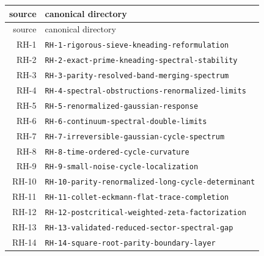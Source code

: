 \begin{longtable}{r >{\raggedright\arraybackslash}p{}}
\toprule
source & canonical directory\\
\midrule
\endfirsthead
\toprule
source & canonical directory\\
\midrule
\endhead
RH-1 & \texttt{RH-\allowbreak{}1-\allowbreak{}rigorous-\allowbreak{}sieve-\allowbreak{}kneading-\allowbreak{}reformulation}\\
RH-2 & \texttt{RH-\allowbreak{}2-\allowbreak{}exact-\allowbreak{}prime-\allowbreak{}kneading-\allowbreak{}spectral-\allowbreak{}stability}\\
RH-3 & \texttt{RH-\allowbreak{}3-\allowbreak{}parity-\allowbreak{}resolved-\allowbreak{}band-\allowbreak{}merging-\allowbreak{}spectrum}\\
RH-4 & \texttt{RH-\allowbreak{}4-\allowbreak{}spectral-\allowbreak{}obstructions-\allowbreak{}renormalized-\allowbreak{}limits}\\
RH-5 & \texttt{RH-\allowbreak{}5-\allowbreak{}renormalized-\allowbreak{}gaussian-\allowbreak{}response}\\
RH-6 & \texttt{RH-\allowbreak{}6-\allowbreak{}continuum-\allowbreak{}spectral-\allowbreak{}double-\allowbreak{}limits}\\
RH-7 & \texttt{RH-\allowbreak{}7-\allowbreak{}irreversible-\allowbreak{}gaussian-\allowbreak{}cycle-\allowbreak{}spectrum}\\
RH-8 & \texttt{RH-\allowbreak{}8-\allowbreak{}time-\allowbreak{}ordered-\allowbreak{}cycle-\allowbreak{}curvature}\\
RH-9 & \texttt{RH-\allowbreak{}9-\allowbreak{}small-\allowbreak{}noise-\allowbreak{}cycle-\allowbreak{}localization}\\
RH-10 & \texttt{RH-\allowbreak{}10-\allowbreak{}parity-\allowbreak{}renormalized-\allowbreak{}long-\allowbreak{}cycle-\allowbreak{}determinant}\\
RH-11 & \texttt{RH-\allowbreak{}11-\allowbreak{}collet-\allowbreak{}eckmann-\allowbreak{}flat-\allowbreak{}trace-\allowbreak{}completion}\\
RH-12 & \texttt{RH-\allowbreak{}12-\allowbreak{}postcritical-\allowbreak{}weighted-\allowbreak{}zeta-\allowbreak{}factorization}\\
RH-13 & \texttt{RH-\allowbreak{}13-\allowbreak{}validated-\allowbreak{}reduced-\allowbreak{}sector-\allowbreak{}spectral-\allowbreak{}gap}\\
RH-14 & \texttt{RH-\allowbreak{}14-\allowbreak{}square-\allowbreak{}root-\allowbreak{}parity-\allowbreak{}boundary-\allowbreak{}layer}\\

\end{longtable}
